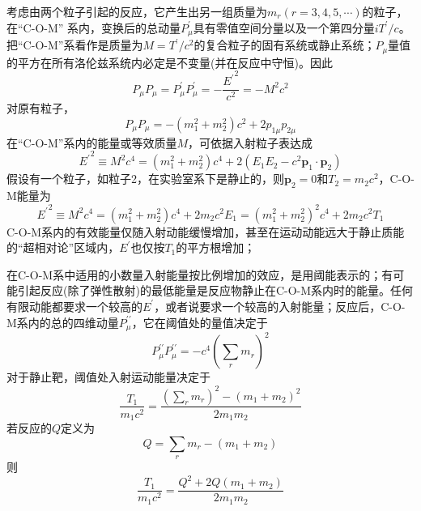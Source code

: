 \documentclass[11pt,a4paper]{article}
\renewcommand{\vec}[1]{\boldsymbol{#1}}
\begin{document}
考虑由两个粒子引起的反应，它产生出另一组质量为$m_r (r = 3, 4, 5, \cdots)$的粒子，在“C-O-M” 系内，变换后的总动量$P^{\prime}_{\mu}$具有零值空间分量以及一个第四分量$iT^{\prime}/c$。把“C-O-M”系看作是质量为$M=T^{\prime}/c^2$的复合粒子的固有系统或静止系统；$P_{\mu}$量值的平方在所有洛伦兹系统内必定是不变量(并在反应中守恒)。因此
\begin{equation}
P_{\mu} P_{\mu} = P^{\prime}_{\mu}P^{\prime}_{\mu} = -\frac{{E^{\prime}}^2}{c^2} = -M^2 c^2
\end{equation}
对原有粒子，
\begin{equation}
P_{\mu} P_{\mu} = -(m_1^2 +m_2^2) c^2 + 2p_{1\mu} p_{2\mu}
\end{equation}
在“C-O-M”系内的能量或等效质量$M$，可依据入射粒子表达成
\begin{equation}
{E^{\prime}}^2 \equiv M^2 c^4 = (m_1^2 +m_2^2) c^4 +2(E_1 E_2 -c^2 \vec{p}_1 \cdot \vec{p}_2 )
\end{equation}
假设有一个粒子，如粒子2，在实验室系下是静止的，则$\vec{p}_2 = 0$和$T_2 = m_2 c^2$，C-O-M能量为
\begin{equation}
{E^{\prime}}^2 \equiv M^2 c^4 = (m_1^2 +m_2^2) c^4 +2m_2 c^2 E_1 =  (m_1^2 +m_2^2)^2 c^4 +2m_2 c^2 T_1
\end{equation}
C-O-M系内的有效能量仅随入射动能缓慢增加，甚至在运动动能远大于静止质能的“超相对论”区域内，$E^{\prime}$也仅按$T_1$的平方根增加；

在C-O-M系中适用的小数量入射能量按比例增加的效应，是用阈能表示的；有可能引起反应(除了弹性散射)的最低能量是反应物静止在C-O-M系内时的能量。任何有限动能都要求一个较高的$E^{\prime}$，或者说要求一个较高的入射能量；反应后，C-O-M系内的总的四维动量$P_{\mu}^{\prime \prime}$，它在阈值处的量值决定于
\begin{equation}
P_{\mu}^{\prime \prime} P_{\mu}^{\prime \prime} = -c^4 \left(\sum_r m_r \right)^2
\end{equation}
对于静止靶，阈值处入射运动能量决定于
\begin{equation}
\frac{T_1}{m_1 c^2} = \frac{\left(\sum\limits_r m_r \right)^2 -(m_1 +m_2)^2}{2m_1 m_2}
\end{equation}
若反应的$Q$定义为
\begin{equation}
Q  = \sum_r m_r -(m_1 +m_2)
\end{equation}
则
\begin{equation}
\frac{T_1}{m_1 c^2} = \frac{Q^2 +2Q(m_1 +m_2)}{2m_1 m_2}
\end{equation}
\end{document}
